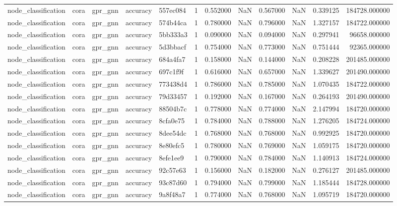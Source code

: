 \begin{tabular}{lllllrrrrrrr}
node_classification & cora & gpr_gnn & accuracy & 557ec084 & 1 & 0.552000 & NaN & 0.567000 & NaN & 0.339125 & 184728.000000 \\
node_classification & cora & gpr_gnn & accuracy & 574b44ca & 1 & 0.780000 & NaN & 0.796000 & NaN & 1.327157 & 184722.000000 \\
node_classification & cora & gpr_gnn & accuracy & 5bb333a3 & 1 & 0.090000 & NaN & 0.094000 & NaN & 0.297941 & 96658.000000 \\
node_classification & cora & gpr_gnn & accuracy & 5d3bbacf & 1 & 0.754000 & NaN & 0.773000 & NaN & 0.751444 & 92365.000000 \\
node_classification & cora & gpr_gnn & accuracy & 684a4fa7 & 1 & 0.158000 & NaN & 0.144000 & NaN & 0.208228 & 201485.000000 \\
node_classification & cora & gpr_gnn & accuracy & 697c1f9f & 1 & 0.616000 & NaN & 0.657000 & NaN & 1.339627 & 201490.000000 \\
node_classification & cora & gpr_gnn & accuracy & 773438d4 & 1 & 0.786000 & NaN & 0.785000 & NaN & 1.070435 & 184722.000000 \\
node_classification & cora & gpr_gnn & accuracy & 79d33457 & 1 & 0.192000 & NaN & 0.167000 & NaN & 0.264193 & 201490.000000 \\
node_classification & cora & gpr_gnn & accuracy & 88504b7c & 1 & 0.778000 & NaN & 0.774000 & NaN & 2.147994 & 184720.000000 \\
node_classification & cora & gpr_gnn & accuracy & 8cfa0e75 & 1 & 0.784000 & NaN & 0.788000 & NaN & 1.276205 & 184724.000000 \\
node_classification & cora & gpr_gnn & accuracy & 8dee54dc & 1 & 0.768000 & NaN & 0.768000 & NaN & 0.992925 & 184720.000000 \\
node_classification & cora & gpr_gnn & accuracy & 8e80efc5 & 1 & 0.780000 & NaN & 0.769000 & NaN & 1.059175 & 184720.000000 \\
node_classification & cora & gpr_gnn & accuracy & 8efe1ee9 & 1 & 0.790000 & NaN & 0.784000 & NaN & 1.140913 & 184724.000000 \\
node_classification & cora & gpr_gnn & accuracy & 92c57e63 & 1 & 0.156000 & NaN & 0.182000 & NaN & 0.276127 & 201485.000000 \\
node_classification & cora & gpr_gnn & accuracy & 93c87d60 & 1 & 0.794000 & NaN & 0.799000 & NaN & 1.185444 & 184728.000000 \\
node_classification & cora & gpr_gnn & accuracy & 9a8f48a7 & 1 & 0.774000 & NaN & 0.768000 & NaN & 1.095719 & 184720.000000 \\

\end{tabular}
